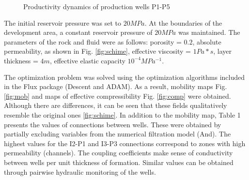 \documentclass[
11pt,%
tightenlines,%
twoside,%
onecolumn,%
nofloats,%
nobibnotes,%
nofootinbib,%
superscriptaddress,%
noshowpacs,%
centertags]%
{revtex4}
\begin{document}
\begin{figure}
	\caption{Productivity dynamics of production wells P1-P5}
	\label{fig:prod_rate}
\end{figure}

The initial reservoir pressure was set to $20 MPa$. At the boundaries of the development area, a constant reservoir pressure of $20 MPa$ was maintained. The parameters of the rock and fluid were as follows: porosity = $0.2$, absolute permeability, as shown in Fig. \ref{fig:schime}, effective viscosity = $1 Pa*s$, layer thickness = $4 m$, effective elastic capacity $10^{-4} MPa^{-1}$.

The optimization problem was solved using the optimization algorithms included in the Flux package (Descent and ADAM). As a result, mobility maps Fig. \ref{fig:mob} and maps of effective compressibility Fig. \ref{fig:comp} were obtained. Although there are differences, it can be seen that these fields qualitatively resemble the original ones \ref{fig:schime}. In addition to the mobility map, Table 1 presents the values of connections between wells. These were obtained by partially excluding variables from the numerical filtration model (And). The highest values for the I2-P1 and I3-P3 connections correspond to zones with high permeability (channels). The coupling coefficients make sense of conductivity between wells per unit thickness of formation. Similar values can be obtained through pairwise hydraulic monitoring of the wells.
\end{document}
